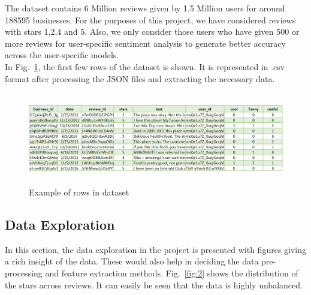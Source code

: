 \documentclass[letterpaper, 10 pt, conference]{ieeeconf}  %
\begin{document}

The dataset contains 6 Million reviews given by 1.5 Million users for around 188595 businesses. For the purposes of this project, we have considered reviews with stars 1,2,4 and 5. Also, we only consider those users who have given 500 or more reviews for user-specific sentiment analysis to generate better accuracy across the user-specific models.\\

In Fig.~\ref{fig:1}, the first few rows of the dataset is shown. It is represented in .csv format after processing the JSON files and extracting the necessary data.

\begin{figure}[htb]
\includegraphics[height = 4cm, width=\textwidth]{img/dataset.png}
\caption{Example of rows in dataset} \label{fig:1}
\end{figure}

\subsection{Data Exploration}

In this section, the data exploration in the project is presented with figures giving a rich insight of the data. These would also help in deciding the data pre-processing and feature extraction methods. Fig.~\ref{fig:2} shows the distribution of the stars across reviews. It can easily be seen that the data is highly unbalanced.
\end{document}
